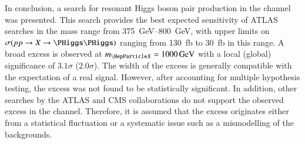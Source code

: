 %
%
%
%

In conclusion, a search for resonant Higgs boson pair production in the
\bbtautau channel was presented. This search provides the best expected
sensitivity of ATLAS searches in the mass range from \SIrange{375}{800}{\GeV},
with upper limits on $\sigma(\pp \to X \to \HH)$ ranging from
\SI{130}{\femto\barn} to \SI{30}{\femto\barn} in this range. A broad excess is
observed at $\mX = \SI{1000}{\GeV}$ with a local (global) significance of
$3.1\sigma$ ($2.0\sigma$). The width of the excess is generally compatible with
the expectation of a real signal. However, after accounting for multiple
hypothesis testing, the excess was not found to be statistically significant. In
addition, other searches by the ATLAS and CMS collaborations do not support the
observed excess in the \bbtautau channel. Therefore, it is assumed that the
excess originates either from a statistical fluctuation or a systematic issue
such as a mismodelling of the backgrounds.



